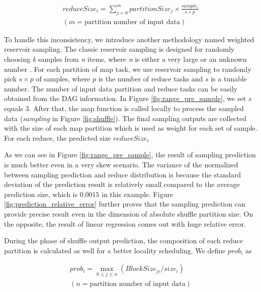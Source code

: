 \begin{equation}
\label{equationsample}
\begin{aligned}
	reduceSize_i = {\displaystyle\sum_{j=0}^{m} {partitionSize_j \times \frac{sample_i}{s \times p}}} \\
	{\left( m = \text{partition number of input data} \right)}
\end{aligned}
\end{equation}

To handle this inconsistency, we introduce another methodology named weighted reservoir sampling. The classic reservoir sampling is designed for randomly choosing \textit{k} samples from \textit{n} items, where \textit{n} is either a very large or an unknown number \cite{reservoir}. For each partition of map task, we use reservoir sampling to randomly pick $s \times p$ of samples, where $p$ is the number of reduce tasks and $s$ is a tunable number. The number of input data partition and reduce tasks can be easily obtained from the DAG information. In Figure \ref{fig:range_pre_sample}, we set $s$ equals $3$. After that, the map function is called locally to process the sampled data (\textit{sampling} in Figure \ref{fig:shuffle}). The final sampling outputs are collected with the size of each map partition which is used as weight for each set of sample. For each reduce, the predicted size $reduceSize_i$

As we can see in Figure \ref{fig:range_pre_sample}, the result of sampling prediction is much better even in a very skew scenario. The variance of the normalized between sampling prediction and reduce distribution is because the standard deviation of the prediction result is relatively small compared to the average prediction size, which is $0.0015$ in this example. Figure \ref{fig:prediction_relative_error} further proves that the sampling prediction can provide precise result even in the dimension of absolute shuffle partition size. On the opposite, the result of linear regression comes out with huge relative error.

During the phase of shuffle output prediction, the composition of each reduce partition is calculated as well for a better locality scheduling. We define $prob_i$ as

\begin{equation}
\label{equationsample}
\begin{aligned}
	prob_i = \max_{0 \leq j \leq n} \left( BlockSize_{ji} / size_i \right)\\
    {\left( n = \text{partition number of input data} \right)}
\end{aligned}
\end{equation}

